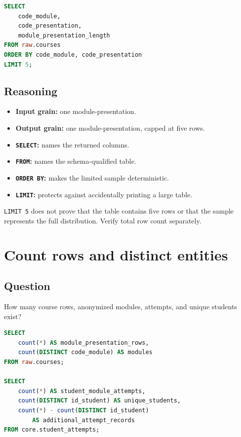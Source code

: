 \begin{lstlisting}[language=SQL,caption={Instructional inspection query.}]
SELECT
    code_module,
    code_presentation,
    module_presentation_length
FROM raw.courses
ORDER BY code_module, code_presentation
LIMIT 5;
\end{lstlisting}

\subsection{Reasoning}
\begin{itemize}
  \item \textbf{Input grain:} one module-presentation.
  \item \textbf{Output grain:} one module-presentation, capped at five rows.
  \item \textbf{\texttt{SELECT}:} names the returned columns.
  \item \textbf{\texttt{FROM}:} names the schema-qualified table.
  \item \textbf{\texttt{ORDER BY}:} makes the limited sample deterministic.
  \item \textbf{\texttt{LIMIT}:} protects against accidentally printing a large
    table.
\end{itemize}

\begin{validationbox}
\texttt{LIMIT 5} does not prove that the table contains five rows or that the
sample represents the full distribution. Verify total row count separately.
\end{validationbox}

\section{Count rows and distinct entities}

\subsection{Question}
How many course rows, anonymized modules, attempts, and unique students exist?

\begin{lstlisting}[language=SQL]
SELECT
    count(*) AS module_presentation_rows,
    count(DISTINCT code_module) AS modules
FROM raw.courses;

SELECT
    count(*) AS student_module_attempts,
    count(DISTINCT id_student) AS unique_students,
    count(*) - count(DISTINCT id_student)
        AS additional_attempt_records
FROM core.student_attempts;
\end{lstlisting}


